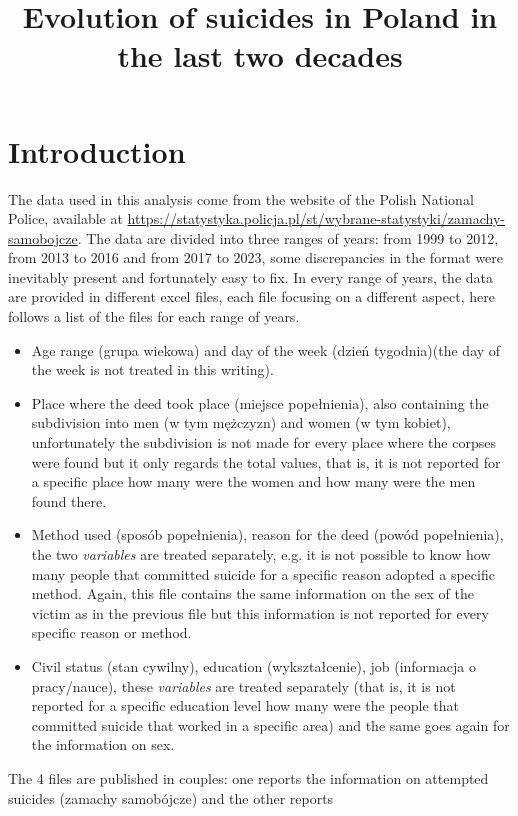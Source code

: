 \documentclass{article}
\title{Evolution of suicides in Poland in the last two decades}
\begin{document}
 

\maketitle

\section{Introduction}
%
The data used in this analysis come from the website of the Polish National
Police, available at 
\url{https://statystyka.policja.pl/st/wybrane-statystyki/zamachy-samobojcze}. 
The data are divided into three ranges of years: from 1999 to 2012,
from 2013 to 2016 and from 2017 to 2023, some discrepancies in the format
were inevitably present and fortunately easy to fix.
In every range of years, the data are provided in different excel files,
each file focusing on a different aspect,
here follows a list of the files for each range of years.
\begin{itemize}
\item Age range (grupa wiekowa) and day of the week (dzień tygodnia)(the day of the week is not 
treated in this writing).
\item Place where the deed took place (miejsce popełnienia), also containing
the subdivision into men (w tym mężczyzn) and women (w tym kobiet),
unfortunately the subdivision is not made for every place where 
the corpses were found but it only regards the total values, that is,
it is not reported for a specific place how many were the women and how many were
the men found there.
\item Method used (sposób popełnienia), 
reason for the deed  (powód popełnienia), the two \textit{variables}
are treated separately, e.g. it is not possible to know how many people
that committed suicide for a specific reason adopted a specific method.
Again, this file contains the same information on the sex of the victim as in
the previous file but
this information is not reported for every specific reason or method.
\item Civil status (stan cywilny), education (wykształcenie),
job (informacja o pracy/nauce), these \textit{variables} are treated
separately (that is, it is not reported for a specific education level how many were the 
people that committed suicide that worked in a specific area)
and the same goes again for the information on sex.
\end{itemize}
The 4 files are published in couples: one reports the information on
attempted suicides (zamachy samobójcze) and the other reports 
\end{document}
